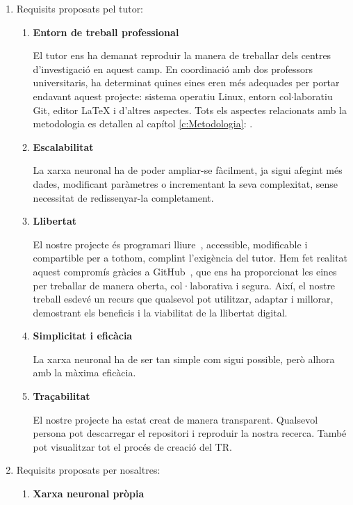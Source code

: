 \begin{enumerate}
\item Requisits proposats pel tutor:
\begin{enumerate}
\item \textbf{Entorn de treball professional}

    El tutor ens ha demanat reproduir la manera de treballar dels centres d'investigació en aquest camp. En coordinació amb dos professors universitaris, ha determinat quines eines eren més adequades per portar endavant aquest projecte: sistema operatiu Linux, entorn col$\cdot$laboratiu Git, editor LaTeX i d'altres aspectes. Tots els aspectes relacionats amb la metodologia es detallen al capítol \ref{c:Metodologia}: .

    \item \textbf{Escalabilitat}

    La xarxa neuronal ha de poder ampliar-se fàcilment, ja sigui afegint més dades, modificant paràmetres o incrementant la seva complexitat, sense necessitat de redissenyar-la completament.



    \item \textbf{Llibertat}

    El nostre projecte és programari lliure~\cite{ProgramariLliure}, accessible, modificable i compartible per a tothom, complint l’exigència del tutor. Hem fet realitat aquest compromís gràcies a GitHub~\cite{GitHub}, que ens ha proporcionat les eines per treballar de manera oberta, col·laborativa i segura. Així, el nostre treball esdevé un recurs que qualsevol pot utilitzar, adaptar i millorar, demostrant els beneficis i la viabilitat de la llibertat digital.

    \item \textbf{Simplicitat i eficàcia}

    La xarxa neuronal ha de ser tan simple com sigui possible, però alhora amb la màxima eficàcia.

    \item \textbf{Traçabilitat}

    El nostre projecte ha estat creat de manera transparent. Qualsevol persona pot  descarregar el repositori i reproduir la nostra recerca. També pot visualitzar tot el procés de creació del TR.
\end{enumerate}

\item Requisits proposats per nosaltres:
\begin{enumerate}
\item \textbf{Xarxa neuronal pròpia}


\end{enumerate}
\end{enumerate}
